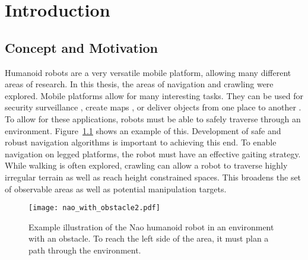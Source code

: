 \chapter{Introduction} \label{ch:introduction}

\section{Concept and Motivation}
Humanoid robots are a very versatile mobile platform, allowing many different
areas of research. In this thesis, the areas of navigation and crawling were
explored.
Mobile platforms allow for many interesting tasks. They can be used for security
surveillance \cite{knightscope}, create maps \cite{Thrun02}, 
or deliver objects from one place to another \cite{savioke}.
To allow for these applications, robots must be able to safely traverse through
an environment. Figure~\ref{fig:nao_with_obstacle2} shows an example of this.
Development of safe and robust navigation algorithms is 
important to achieving this end.
To enable navigation on legged platforms, the robot must have an effective
gaiting strategy. While walking is often explored, crawling can allow a robot
to traverse highly irregular terrain as well as reach height constrained spaces.
This broadens the set of observable areas as well as potential manipulation
targets.

\begin{figure}[h!]
	\centering
    \texttt{[image: nao\_with\_obstacle2.pdf]}
	\caption{Example illustration of the Nao humanoid robot in an environment 
             with an obstacle. To reach the left side of the area,
             it must plan a path through the environment.}
	\label{fig:nao_with_obstacle2}
\end{figure}

